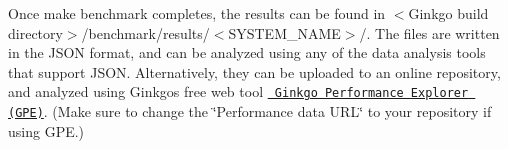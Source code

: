 Once {\ttfamily make benchmark} completes, the results can be found in {\ttfamily $<$Ginkgo build directory$>$/benchmark/results/$<$S\+Y\+S\+T\+E\+M\+\_\+\+N\+A\+ME$>$/}. The files are written in the J\+S\+ON format, and can be analyzed using any of the data analysis tools that support J\+S\+ON. Alternatively, they can be uploaded to an online repository, and analyzed using Ginkgo\textquotesingle{}s free web tool \href{https://ginkgo-project.github.io/gpe/}{\texttt{ Ginkgo Performance Explorer (G\+PE)}}. (Make sure to change the \char`\"{}\+Performance data U\+R\+L\char`\"{} to your repository if using G\+PE.) 